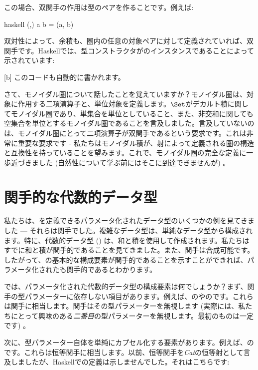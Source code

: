 この場合、双関手の作用は型のペアを作ることです。例えば: 

\begin{snip}{haskell}
(,) a b = (a, b)
\end{snip}
双対性によって、余積も、圏内の任意の対象ペアに対して定義されていれば、双関手です。Haskellでは、型コンストラクタがのインスタンスであることによって示されています: 

[b]
このコードも自動的に書かれます。

さて、モノイダル圏について話したことを覚えていますか？モノイダル圏は、対象に作用する二項演算子と、単位対象を定義します。$\Set$がデカルト積に関してモノイダル圏であり、単集合を単位としていること、また、非交和に関しても空集合を単位とするモノイダル圏であることを言及しました。言及していないのは、モノイダル圏にとって二項演算子が双関手であるという要求です。これは非常に重要な要求です - 私たちはモノイダル積が、射によって定義される圏の構造と互換性を持っていることを望みます。これで、モノイダル圏の完全な定義に一歩近づきました (自然性について学ぶ前にはそこに到達できませんが) 。

\section{関手的な代数的データ型}

私たちは、を定義できるパラメータ化されたデータ型のいくつかの例を見てきました --- それらは関手でした。複雑なデータ型は、単純なデータ型から構成されます。特に、代数的データ型 () は、和と積を使用して作成されます。私たちはすでに和と積が関手的であることを見てきました。また、関手は合成可能です。したがって、の基本的な構成要素が関手的であることを示すことができれば、パラメータ化されたも関手的であるとわかります。

では、パラメータ化された代数的データ型の構成要素は何でしょうか？まず、関手の型パラメーターに依存しない項目があります。例えば、のやのです。これらは関手に相当します。関手はその型パラメーターを無視します (実際には、私たちにとって興味のある\emph{二番目}の型パラメーターを無視します。最初のものは一定です) 。

次に、型パラメーター自体を単純にカプセル化する要素があります。例えば、のです。これらは恒等関手に相当します。以前、恒等関手を\emph{Cat}の恒等射として言及しましたが、Haskellでの定義は示しませんでした。それはこちらです: 

